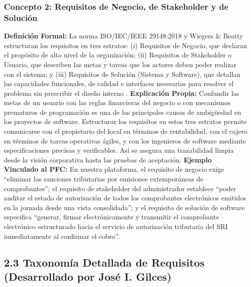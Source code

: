 \subsubsection{Concepto 2: Requisitos de Negocio, de Stakeholder y de Solución}
\textbf{Definición Formal:} La norma ISO/IEC/IEEE 29148:2018 \cite{ieee29148} y Wiegers \& Beatty \cite{wiegers2013} estructuran los requisitos en tres estratos: (i) Requisitos de Negocio, que declaran el propósito de alto nivel de la organización; (ii) Requisitos de Stakeholder o Usuario, que describen las metas y tareas que los actores deben poder realizar con el sistema; y (iii) Requisitos de Solución (Sistema y Software), que detallan las capacidades funcionales, de calidad e interfaces necesarias para resolver el problema sin prescribir el diseño interno \cite{ieee29148, ireb2023}.
\textbf{Explicación Propia:} Confundir las metas de un usuario con las reglas financieras del negocio o con mecanismos prematuros de programación es una de las principales causas de ambigüedad en los proyectos de software. Estructurar los requisitos en estos tres estratos permite comunicarse con el propietario del local en términos de rentabilidad, con el cajero en términos de tareas operativas ágiles, y con los ingenieros de software mediante especificaciones precisas y verificables. Así se asegura una trazabilidad limpia desde la visión corporativa hasta las pruebas de aceptación.
\textbf{Ejemplo Vinculado al PFC:} En nuestra plataforma, el requisito de negocio exige ``eliminar las sanciones tributarias por emisiones extemporáneas de comprobantes''; el requisito de stakeholder del administrador establece ``poder auditar el estado de autorización de todos los comprobantes electrónicos emitidos en la jornada desde una vista consolidada''; y el requisito de solución de software especifica ``generar, firmar electrónicamente y transmitir el comprobante electrónico estructurado hacia el servicio de autorización tributaria del SRI inmediatamente al confirmar el cobro''.
\subsection{2.3 Taxonomía Detallada de Requisitos (Desarrollado por José I. Gilces)}
